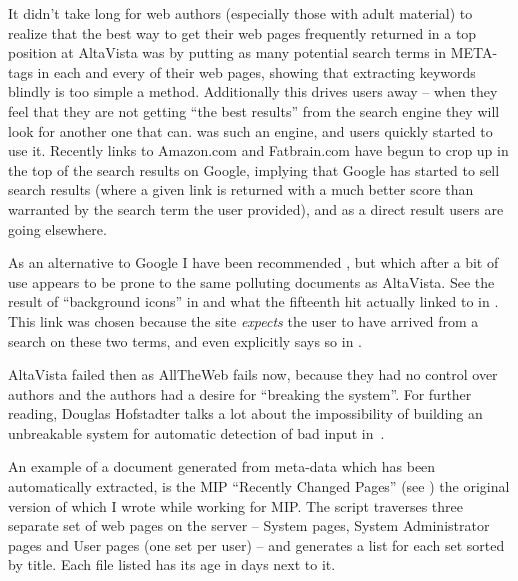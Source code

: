 It didn't take long for web authors (especially those with adult
material) to realize that the best way to get their web pages
frequently returned in a top position at AltaVista was by putting as
many potential search terms in META-tags in each and every of their
web pages, showing that extracting keywords blindly 
is too simple a method.  Additionally this
drives users away -- when they feel that they are not getting ``the
best results'' from the search engine they will look for another one
that can.  was such an engine, and users quickly
started to use it. Recently links to Amazon.com and Fatbrain.com have
begun to crop up in the top of the search results on Google, implying
that Google has started to sell search results (where a given link is
returned with a much better score than warranted by the search term
the user provided), and as a direct result users are going elsewhere.

As an alternative to Google I have been recommended
, but which after a bit of
use appears to be prone to the same polluting documents as AltaVista.
See the result of ``background icons'' in
 and what the fifteenth hit actually
linked to in . This link was
chosen because the site \textit{expects} the user to have
arrived from a search on these two terms, and even explicitly 
says so in .




AltaVista failed then as AllTheWeb fails now, because they had no
control over authors and the authors had a desire for ``breaking the
system''.  For further reading, Douglas Hofstadter talks a lot about
the impossibility of building an unbreakable system for automatic
detection of bad input in~\cite{goedelescherbach}.



 An example of a document generated from
meta-data which has been automatically extracted, is the MIP
``Recently Changed Pages'' (see ) the
original version of which I wrote while working for MIP{}.
The script traverses three separate set of web pages on the
server -- System pages, System Administrator pages and User
pages (one set per user) -- and generates a list for each set
sorted by title.  Each file listed has its age in days next
to it.

